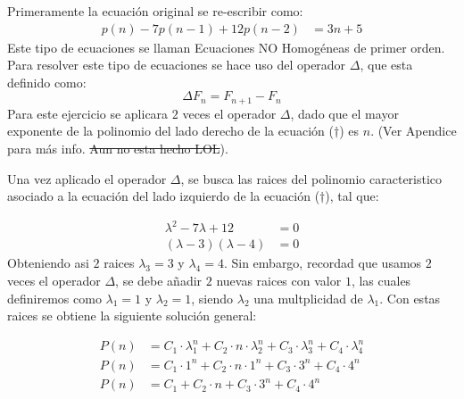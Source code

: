 \begin{solution}
Primeramente la ecuación original se re-escribir como:
\begin{align*}
    p(n)-7p(n-1) +12p(n-2) &=3n +5 \tag{$\dagger$}
\end{align*}
Este tipo de ecuaciones se llaman Ecuaciones NO Homogéneas de primer orden. Para resolver este tipo de ecuaciones se hace uso del operador $\Delta$, que esta definido como:
$$\Delta F_n = F_{n+1} - F_n$$
Para este ejercicio se aplicara $2$ veces el operador $\Delta$, dado que el mayor exponente de la polinomio del lado derecho de la ecuación ($\dagger$) es $n$. (Ver Apendice para más info. \st{Aun no esta hecho LOL}).

Una vez aplicado el operador $\Delta$, se busca las raices del polinomio caracteristico asociado a la ecuación  del lado izquierdo de la ecuación ($\dagger$), tal que:

\begin{align*}
    \lambda^2 -7\lambda + 12 &= 0\\
    (\lambda -3)(\lambda -4)&= 0
\end{align*}
Obteniendo asi $2$ raices $\lambda_3 = 3$ y $\lambda_4 = 4$. Sin embargo, recordad que usamos $2$ veces el operador $\Delta$, se debe añadir $2$ nuevas raices con valor $1$, las cuales definiremos como $\lambda_1 =1$ y $\lambda_2 = 1$, siendo $\lambda_2$ una multplicidad de $\lambda_1$.
Con estas raices se obtiene la siguiente solución general:

\begin{align*}
    P(n) &= C_1 \cdot \lambda_1^n + C_2 \cdot n \cdot \lambda_2^n + C_3 \cdot \lambda_3^n + C_4 \cdot \lambda_4^n\\
    P(n) &= C_1 \cdot 1^n + C_2 \cdot n \cdot 1^n + C_3 \cdot 3^n + C_4 \cdot 4^n\\
    P(n) &= C_1+ C_2 \cdot n + C_3 \cdot 3^n + C_4 \cdot 4^n \tag{$\star$}
\end{align*}


\end{solution}
